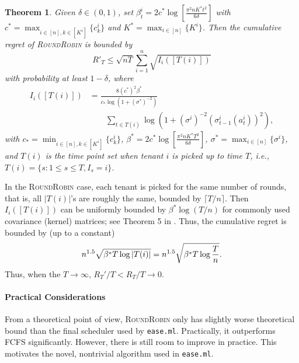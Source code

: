 \documentclass[letterpaper]{vldb}
\newcommand{\eml}{\texttt{ease.ml}\xspace}
\newcommand{\rr}{\textsc{RoundRobin}\xspace}
\newtheorem{theorem}{Theorem}
\begin{document}
\vspace{-0.5em}
\begin{theorem}
  \label{thm:rr}
  Given $\delta\in (0,1)$, set $\beta_t^i = 2c^\ast \log\left[\frac{\pi^2 n K^\ast t^2}{6\delta}\right]$ with $c^\ast = \max_{i\in [n], k\in [K^i]}\{c^i_k\}$ and $K^\ast = \max_{i\in [n]}\{K^i\}$. Then the
  cumulative regret of \rr is bounded by
  \[
     R'_T \leq \sqrt{n T}\sum_{i=1}^n \sqrt{I_i([T(i)])}
  \]
  with probability at least $1-\delta$,
  where
  \begin{align*}
    I_i([T(i)]) & = \frac{8 (c^\ast)^2 \beta^\ast}{c_\ast \log(1 + (\sigma^\ast)^{-2})}\\
    &\qquad \sum_{t\in T(i)} \log\left(1 + (\sigma^i)^{-2}(\sigma^i_{t-1}(a^i_{t}))^2\right),
  \end{align*}
  with $c_\ast = \min_{i\in [n], k\in [K^i]}\{c^i_k\}$,  $\beta^\ast = 2c^\ast \log\left[\frac{\pi^2 n K^\ast T^2}{6\delta}\right]$, $\sigma^\ast= \max_{i\in [n]}\{\sigma^i\}$, and $T(i)$ is the time point set when tenant $i$ is picked up to time $T$, i.e.,
  $T(i) = \{s: 1\le s\le T, I_s = i\}$.
\end{theorem}

In the \rr case, each tenant is picked for the same number of rounds, that is, all $|T(i)|$'s are roughly the same, bounded by $\lceil T/n\rceil$. Then $I_i([T(i)])$ can be uniformly bounded by $\beta^\ast \log (T/n)$ for commonly used covariance (kernel) matrices; see Theorem 5 in \cite{SrinivasKKS10}. Thus, the cumulative regret is bounded by (up to a constant) 
\begin{equation}
n^{1.5}\sqrt{\beta^\ast T \log |T(i)|} = n^{1.5}\sqrt{\beta^\ast T \log {T\over n}}.
\label{eq:RR_simple_bound}
\end{equation}
Thus, when the $T \rightarrow \infty$,
$R_T'/T < R_T/T \rightarrow 0$.

\vspace{-0.5em}
\paragraph*{Practical Considerations}
From a theoretical point of view,
\rr only has slightly worse theoretical bound
than the final scheduler used by \eml.
Practically, it outperforms FCFS 
significantly. However, there is
still room to improve in practice. This
motivates the novel, nontrivial algorithm
used in \eml.
\end{document}
